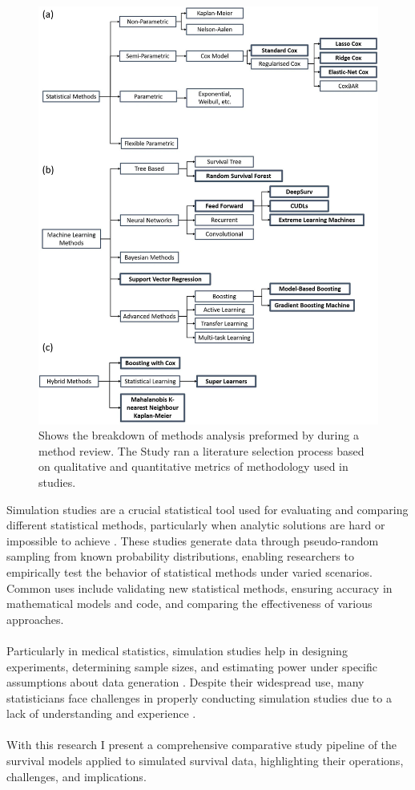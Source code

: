\begin{figure}
    \centering
    \includegraphics[scale=0.3]{Figures/ML_STATS_MODELS.jpg}
    \caption{Shows the breakdown of methods analysis preformed by \parencite{smith_scoping_2022} during a method review. The Study ran a literature selection process based on qualitative and quantitative metrics of methodology used in studies.}
    \label{fig:statsmodels}
\end{figure}

\pagebreak
\noindent Simulation studies are a crucial statistical tool used for evaluating and comparing different statistical methods, particularly when analytic solutions are hard or impossible to achieve \parencite{morris_using_2019}. These studies generate data through pseudo-random sampling from known probability distributions, enabling researchers to empirically test the behavior of statistical methods under varied scenarios. Common uses include validating new statistical methods, ensuring accuracy in mathematical models and code, and comparing the effectiveness of various approaches.
\\\\
\noindent Particularly in medical statistics, simulation studies help in designing experiments, determining sample sizes, and estimating power under specific assumptions about data generation \parencite{morris_using_2019}. Despite their widespread use, many statisticians face challenges in properly conducting simulation studies due to a lack of understanding and experience \parencite{morris_using_2019}. 
\\\\
\noindent With this research I present a comprehensive comparative study pipeline of the survival models applied to simulated survival data, highlighting their operations, challenges, and implications.

